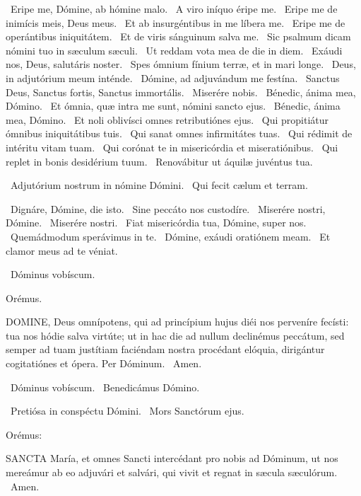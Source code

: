\V\ Eripe me, Dómine, ab hómine malo. \R\ A viro iníquo éripe me. \V\ Eripe me de inimícis meis, Deus meus. \R\ Et ab insurgéntibus in me líbera me. \V\ Eripe me de operántibus iniquitátem. \R\ Et de viris sánguinum salva me. \V\ Sic psalmum dicam nómini tuo in sæculum sæculi. \R\ Ut reddam vota mea de die in diem. \V\ Exáudi nos, Deus, salutáris noster. \R\ Spes ómnium fínium terræ, et in mari longe. \V\ Deus, in adjutórium meum inténde. \R\ Dómine, ad adjuvándum me festína. \V\ Sanctus Deus, Sanctus fortis, Sanctus immortális. \R\ Miserére nobis. \V\ Bénedic, ánima mea, Dómino. \R\ Et ómnia, quæ intra me sunt, nómini sancto ejus. \V\ Bénedic, ánima mea, Dómino. \R\ Et noli oblivísci omnes retributiónes ejus. \V\ Qui propitiátur ómnibus iniquitátibus tuis. \R\ Qui sanat omnes infirmitátes tuas. \V\ Qui rédimit de intéritu vitam tuam. \R\ Qui corónat te in misericórdia et miseratiónibus. \V\ Qui replet in bonis desidérium tuum. \R\ Renovábitur ut áquilæ juvéntus tua.


\V\ Adjutórium nostrum in nómine Dómini. \R\ Qui fecit cælum et terram.


\V\ Dignáre, Dómine, die isto. \R\ Sine peccáto nos custodíre. \V\ Miserére nostri, Dómine. \R\ Miserére nostri. \V\ Fiat misericórdia tua, Dómine, super nos. \R\ Quemádmodum sperávimus in te. \V\ Dómine, exáudi oratiónem meam. \R\ Et clamor meus ad te véniat.

\V\ Dóminus vobíscum.

Orémus. 

\lettrine[lines=2]{D}{OMINE}, Deus omnípotens, qui ad princípium hujus diéi nos perveníre fecísti: tua nos hódie salva virtúte; ut in hac die ad nullum declinémus peccátum, sed semper ad tuam justítiam faciéndam nostra procédant elóquia, dirigántur cogitatiónes et ópera. Per Dóminum. \R\ Amen.

\V\ Dóminus vobíscum. \V\ Benedicámus Dómino.


\V\ Pretiósa in conspéctu Dómini. \R\ Mors Sanctórum ejus.

 Orémus:


\lettrine[lines=2]{S}{ANCTA} María, et omnes Sancti intercédant pro nobis ad Dóminum, ut nos mereámur ab eo adjuvári et salvári, qui vivit et regnat in sæcula sæculórum. \R\ Amen.

